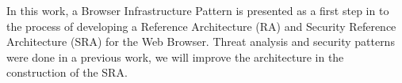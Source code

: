 \documentclass{sig-alternate-05-2015}
\begin{document}
In this work, a Browser Infrastructure Pattern is presented as a first step in to the process of developing a Reference Architecture (RA) and Security Reference Architecture (SRA) for the Web Browser. Threat analysis and security patterns were done in a previous work, we will improve the architecture in the construction of the SRA.




\end{document}

